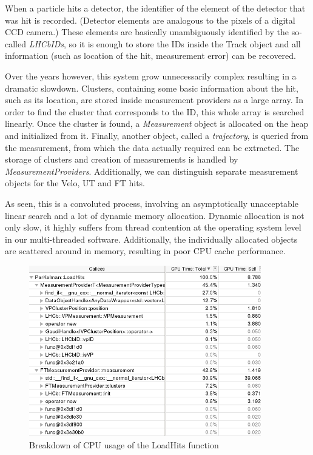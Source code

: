 \documentclass[12pt]{article}
\begin{document}
When a particle hits a detector, the identifier of the element of the detector that was hit is recorded. (Detector elements are analogous to the pixels of a digital CCD camera.) These elements are basically unambiguously identified by the so-called \textit{LHCbIDs}, so it is enough to store the IDs inside the Track object and all information (such as location of the hit, measurement error) can be recovered. 

Over the years however, this system grow unnecessarily complex resulting in a dramatic slowdown. Clusters, containing some basic information about the hit, such as its location, are stored inside measurement providers as a large array. In order to find the cluster that corresponds to the ID, this whole array is searched linearly. Once the cluster is found, a \textit{Measurement} object is allocated on the heap and initialized from it. Finally, another object, called a \textit{trajectory}, is queried from the measurement, from which the data actually required can be extracted. The storage of clusters and creation of measurements is handled by \textit{MeasurementProviders}. Additionally, we can distinguish separate measurement objects for the Velo, UT and FT hits.

As seen, this is a convoluted process, involving an asymptotically unacceptable linear search and a lot of dynamic memory allocation. Dynamic allocation is not only slow, it highly suffers from thread contention at the operating system level in our multi-threaded software. Additionally, the individually allocated objects are scattered around in memory, resulting in poor CPU cache performance.

\begin{figure}[H]
	\begin{center}
		\includegraphics[width=0.9\textwidth]{kalmanfit_loadhits_breakdown}
	\end{center}
	\caption{Breakdown of CPU usage of the LoadHits function}
	\label{fig_kalmanfit_loadhits_breakdown}
\end{figure}
\end{document}
